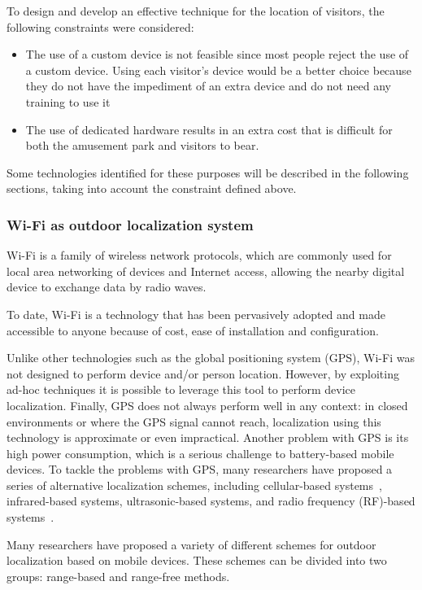 To design and develop an effective technique for the location of visitors, the following constraints were considered:
\begin{itemize}
	\item The use of a custom device is not feasible since most people reject the use of a custom device. Using each visitor's device would
	      be a better choice because they do not have the impediment of an extra device and do not need any training to use it
	\item The use of dedicated hardware results in an extra cost that is difficult for both the amusement park and visitors to bear.
\end{itemize}

Some technologies identified for these purposes will be described in the following sections, taking into account the constraint defined above.

\subsubsection{Wi-Fi as outdoor localization system}\label{subsec:wi-fi-as-outdoor-localization-system}

Wi-Fi is a family of wireless network protocols, which are commonly used for local area networking of devices and Internet access, allowing the nearby digital device to exchange data by radio waves.

To date, Wi-Fi is a technology that has been pervasively adopted and made accessible to anyone because of cost, ease of installation and configuration.

Unlike other technologies such as the global positioning system (GPS), Wi-Fi was not designed to perform device and/or person location.
However, by exploiting ad-hoc techniques it is possible to leverage this tool to perform device localization.
Finally, GPS does not always perform well in any context: in closed environments or where the GPS signal cannot reach, localization using
this technology is approximate or even impractical.
Another problem with GPS is its high power consumption, which is a serious challenge to battery-based mobile devices.
To tackle the problems with GPS, many researchers have proposed a series of alternative localization schemes, including cellular-based
systems~\cite{ibrahim2010cellsense}, infrared-based systems, ultrasonic-based systems, and radio frequency (RF)-based
systems~\cite{bahl2000radar, youssef2002probabilistic}.

Many researchers have proposed a variety of different schemes for outdoor localization based on mobile devices.
These schemes can be divided into two groups: range-based and range-free methods.

